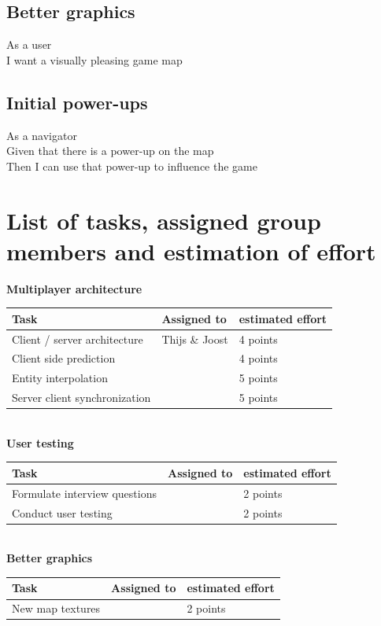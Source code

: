 \documentclass{article}
\begin{document}
\subsection*{Better graphics}
As a user\\
I want a visually pleasing game map
\subsection*{Initial power-ups}
As a navigator\\
Given that there is a power-up on the map\\
Then I can use that power-up to influence the game
\section*{List of tasks, assigned group members and estimation of effort}
\textbf{Multiplayer architecture} \\
\begin{tabular}{ | l | l | l | }
\hline
\textbf{Task} & \textbf{Assigned to} & \textbf{estimated effort} \\ \hline
Client / server architecture & Thijs \& Joost & 4 points \\ \hline
Client side prediction & & 4 points \\\hline
Entity interpolation &  & 5 points \\ \hline
Server client synchronization & & 5 points \\ \hline
\end{tabular} \newline
\newline \\
\textbf{User testing} \\
\begin{tabular}{ | l | l | l | }
\hline
\textbf{Task} & \textbf{Assigned to} & \textbf{estimated effort} \\ \hline
Formulate interview questions &  & 2 points \\ \hline
Conduct user testing & & 2 points \\\hline
\end{tabular} \newline
\newline \\
\textbf{Better graphics} \\
\begin{tabular}{ | l | l | l | }
\hline
\textbf{Task} & \textbf{Assigned to} & \textbf{estimated effort} \\ \hline
New map textures &  & 2 points \\ \hline
\end{tabular} \newline
\end{document}
